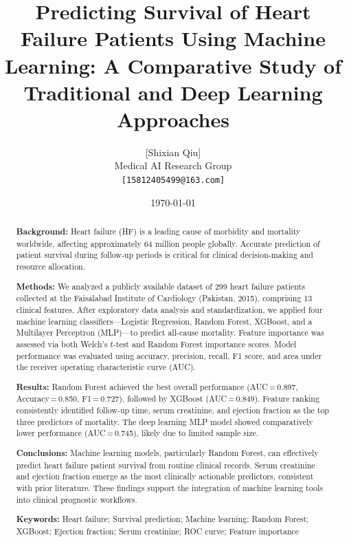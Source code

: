 \documentclass[12pt, a4paper]{article}
\title{Predicting Survival of Heart Failure Patients Using Machine Learning:
A Comparative Study of Traditional and Deep Learning Approaches}
\author{
    [Shixian Qiu]\\
    \small Medical AI Research Group\\
    \small \texttt{[15812405499@163.com]}
}
\date{\today}
\begin{document}
\maketitle
\thispagestyle{empty}

\begin{abstract}
\noindent
\textbf{Background:} Heart failure (HF) is a leading cause of morbidity and 
mortality worldwide, affecting approximately 64 million people globally. 
Accurate prediction of patient survival during follow-up periods is critical 
for clinical decision-making and resource allocation.

\noindent
\textbf{Methods:} We analyzed a publicly available dataset of 299 heart failure 
patients collected at the Faisalabad Institute of Cardiology (Pakistan, 2015), 
comprising 13 clinical features. After exploratory data analysis and 
standardization, we applied four machine learning classifiers—Logistic 
Regression, Random Forest, XGBoost, and a Multilayer Perceptron (MLP)—to 
predict all-cause mortality. Feature importance was assessed via both Welch's 
$t$-test and Random Forest importance scores. Model performance was evaluated 
using accuracy, precision, recall, F1 score, and area under the receiver 
operating characteristic curve (AUC).

\noindent
\textbf{Results:} Random Forest achieved the best overall performance 
(AUC\,=\,0.897, Accuracy\,=\,0.850, F1\,=\,0.727), followed by XGBoost 
(AUC\,=\,0.849). Feature ranking consistently identified follow-up time, 
serum creatinine, and ejection fraction as the top three predictors of 
mortality. The deep learning MLP model showed comparatively lower performance 
(AUC\,=\,0.745), likely due to limited sample size.

\noindent
\textbf{Conclusions:} Machine learning models, particularly Random Forest, 
can effectively predict heart failure patient survival from routine clinical 
records. Serum creatinine and ejection fraction emerge as the most clinically 
actionable predictors, consistent with prior literature. These findings support 
the integration of machine learning tools into clinical prognostic workflows.

\medskip
\noindent\textbf{Keywords:} Heart failure; Survival prediction; Machine 
learning; Random Forest; XGBoost; Ejection fraction; Serum creatinine; 
ROC curve; Feature importance
\end{abstract}

\newpage
\tableofcontents
\newpage
\end{document}

